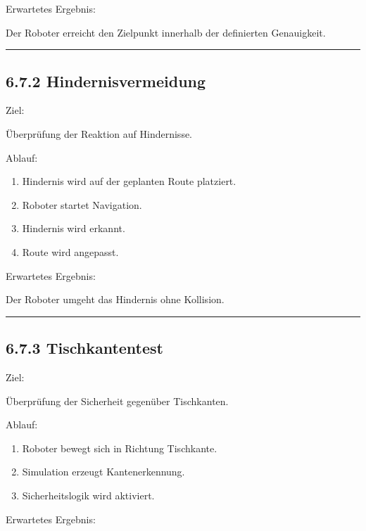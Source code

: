 \documentclass[
]{article}
\providecommand{\tightlist}{%
  \setlength{\itemsep}{0pt}\setlength{\parskip}{0pt}}
\begin{document}
Erwartetes Ergebnis:

Der Roboter erreicht den Zielpunkt innerhalb der definierten
Genauigkeit.

\begin{center}\rule{0.5\linewidth}{0.5pt}\end{center}

\subsection{6.7.2 Hindernisvermeidung}\label{hindernisvermeidung}

Ziel:

Überprüfung der Reaktion auf Hindernisse.

Ablauf:

\begin{enumerate}
\def\labelenumi{\arabic{enumi}.}
\tightlist
\item
  Hindernis wird auf der geplanten Route platziert.
\item
  Roboter startet Navigation.
\item
  Hindernis wird erkannt.
\item
  Route wird angepasst.
\end{enumerate}

Erwartetes Ergebnis:

Der Roboter umgeht das Hindernis ohne Kollision.

\begin{center}\rule{0.5\linewidth}{0.5pt}\end{center}

\subsection{6.7.3 Tischkantentest}\label{tischkantentest}

Ziel:

Überprüfung der Sicherheit gegenüber Tischkanten.

Ablauf:

\begin{enumerate}
\def\labelenumi{\arabic{enumi}.}
\tightlist
\item
  Roboter bewegt sich in Richtung Tischkante.
\item
  Simulation erzeugt Kantenerkennung.
\item
  Sicherheitslogik wird aktiviert.
\end{enumerate}

Erwartetes Ergebnis:
\end{document}
